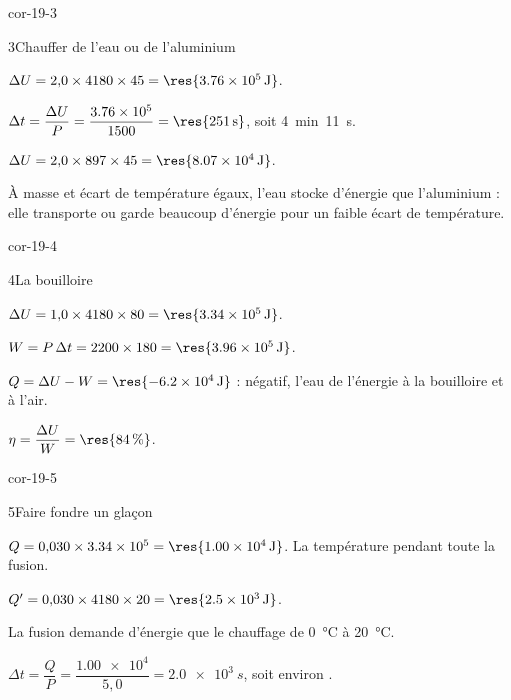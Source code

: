 \begin{blocLivre}{cor-19-3}
\begin{corrige}{3}{Chauffer de l'eau ou de l'aluminium}
\begin{questions}
\item $\Delta U=2{,}0\times4180\times45=\res{\qty{3,76e5}{J}}$.
\item $\Delta t=\dfrac{\Delta U}{P}=\dfrac{\num{3.76e5}}{1500}=\res{\qty{251}{s}}$, soit 4~min~11~s.
\item $\Delta U=2{,}0\times897\times45=\res{\qty{8,07e4}{J}}$.
\item À masse et écart de température égaux, l'eau stocke  d'énergie que l'aluminium : elle
transporte ou garde beaucoup d'énergie pour un faible écart de température.
\end{questions}
\end{corrige}
\end{blocLivre}
\begin{blocLivre}{cor-19-4}
\begin{corrige}{4}{La bouilloire}
\begin{questions}
\item $\Delta U=1{,}0\times4180\times80=\res{\qty{3,34e5}{J}}$.
\item $W=P\,\Delta t=2200\times180=\res{\qty{3,96e5}{J}}$.
\item $Q=\Delta U-W=\res{\qty{-6,2e4}{J}}$ : négatif, l'eau  de l'énergie à la bouilloire et à l'air.
\item $\eta=\dfrac{\Delta U}{W}=\res{\qty{84}{\percent}}$.
\end{questions}
\end{corrige}
\end{blocLivre}
\begin{blocLivre}{cor-19-5}
\begin{corrige}{5}{Faire fondre un glaçon}
\begin{questions}
\item $Q=0{,}030\times\num{3.34e5}=\res{\qty{1,00e4}{J}}$. La température 
pendant toute la fusion.
\item $Q'=0{,}030\times4180\times20=\res{\qty{2,5e3}{J}}$.
\item La fusion demande  d'énergie que le chauffage de \qty{0}{\degreeCelsius} à \qty{20}{\degreeCelsius}.
\item $\Delta t=\dfrac{Q}{P}=\dfrac{\num{1.00e4}}{5{,}0}=\qty{2,0e3}{s}$, soit environ .
\end{questions}
\end{corrige}
\end{blocLivre}
